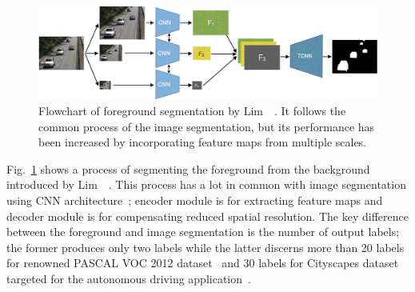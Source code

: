 \documentclass[11pt]{hyu_thesis}
\begin{document}
\begin{figure}
	\centering
	\includegraphics[width=0.8\linewidth]{bg_dcnn.png}
	\caption{Flowchart of foreground segmentation by Lim~\etal~\cite{Lim2018}. It follows the common process of the image segmentation, but its performance has been increased by incorporating feature maps from multiple scales.}
	\label{fig:bg_dcnn}
\end{figure}
Fig.~\ref{fig:bg_dcnn} shows a process of segmenting the foreground from the background introduced by Lim~\etal~\cite{Lim2018}. This process has a lot in common with image segmentation using CNN architecture~\cite{Long2015,Chen2014,Chen2016,Chen2017,Zhao2017,Chen2018}; encoder module is for extracting feature maps and decoder module is for compensating reduced spatial resolution. The key difference between the foreground and image segmentation is the number of output labels; the former produces only two labels while the latter discerns more than 20 labels for renowned PASCAL VOC 2012 dataset~\cite{Everingham15} and 30 labels for Cityscapes dataset targeted for the autonomous driving application~\cite{Cordts2016Cityscapes}.
\end{document}
